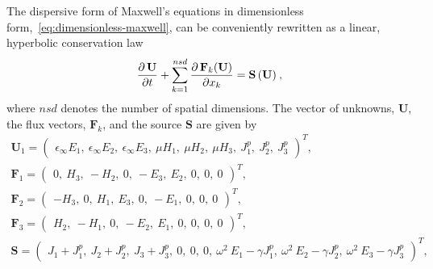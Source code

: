 The dispersive form of Maxwell's equations in dimensionless form,~\eqref{eq:dimensionless-maxwell}, can be conveniently rewritten as a linear, hyperbolic conservation law~\cite{Godlewski:2013tj,LeVeque:2002vc}
\begin{equation}
\frac{\partial  \, \mathbf{U}}{\partial t} + \sum_{k=1}^{nsd} \frac { \partial \, \mathbf{F}_k(\mathbf{U}) }{ \partial x_k } = \mathbf{S}\,(\mathbf{U}) \: ,
\label{maxwell-curl-equations-conservation-form}
\end{equation}
where $nsd$ denotes the number of spatial dimensions. The vector of unknowns, $\mathbf{U}$, the flux vectors, $\mathbf{F}_k$, and the source $\mathbf{S}$ are given by
\begin{equation*}
\begin{array}{c}
\mathbf{U}_1 =
  \begin{pmatrix}
    \epsilon_{\infty} E_1, \:
    \epsilon_{\infty} E_2 , \:
    \epsilon_{\infty} E_3 , \:
    \mu H_1 , \:
    \mu H_2 , \:
    \mu H_3 , \:
    J^p_1 , \:
    J^p_2 , \:
    J^p_3
\end{pmatrix}^T,
\\
\mathbf{F}_1 =
  \begin{pmatrix}
    0 ,\:
    H_3 ,\:
    -H_2 ,\:
    0 ,\:
    -E_3 ,\:
    E_2 ,\:
    0 ,\:
    0 ,\:
    0
  \end{pmatrix}^T , \\

\mathbf{F}_2 =
  \begin{pmatrix}
    - H_3 ,\:
    0 ,\:
    H_1 ,\:
    E_3 ,\:
    0 ,\:
    -E_1 ,\:
    0 ,\:
     0 ,\:
    0
  \end{pmatrix}^T , \\

\mathbf{F}_3 =
  \begin{pmatrix}
    H_2 ,\:
    -H_1 ,\:
    0 ,\:
    -E_2 ,\:
    E_1 ,\:
    0 ,\:
    0 ,\:
    0 ,\:
    0
  \end{pmatrix}^T , \\

\mathbf{S} =
  \begin{pmatrix}
    J_1 + J^p_1 ,\:
    J_2 + J^p_2 ,\:
    J_3 + J^p_3 ,\:
    0 ,\:
    0 ,\:
    0 ,\:
    \omega^2 \: E_1 - \gamma J^p_1 ,\:
    \omega^2 \: E_2 - \gamma J^p_2 ,\:
    \omega^2 \: E_3 - \gamma J^p_3
  \end{pmatrix}^T,

\end{array}
\end{equation*}

